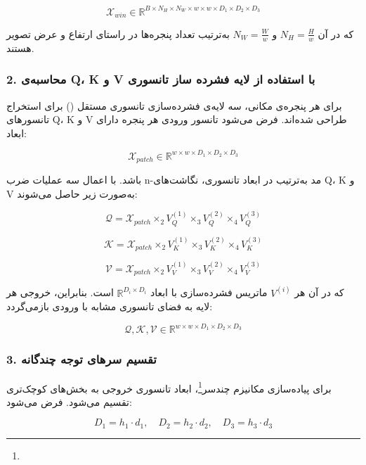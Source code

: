 \[
\mathcal{X}_{win} \in \mathbb{R}^{B \times N_H \times N_W \times w \times w \times D_1 \times D_2 \times D_3}
\]

که در آن $N_H = \frac{H}{w}$ و $N_W = \frac{W}{w}$ به‌ترتیب تعداد پنجره‌ها در راستای ارتفاع و عرض تصویر هستند.

\subsubsection*{2. محاسبه‌ی Q، K و V با استفاده از لایه فشرده ساز تانسوری}

برای هر پنجره‌ی مکانی، سه لایه‌ی فشرده‌سازی تانسوری مستقل () برای استخراج تانسورهای Q، K و V طراحی شده‌اند. فرض می‌شود تانسور ورودی هر پنجره دارای ابعاد:

\[
\mathcal{X}_{patch} \in \mathbb{R}^{w \times w \times D_1 \times D_2 \times D_3}
\]

باشد. با اعمال سه عملیات ضرب n-مد به‌ترتیب در ابعاد تانسوری، نگاشت‌های Q، K و V به‌صورت زیر حاصل می‌شوند:

\begin{equation}
	\mathcal{Q} = \mathcal{X}_{patch} \times_2 V_Q^{(1)} \times_3 V_Q^{(2)} \times_4 V_Q^{(3)}
\end{equation}

\begin{equation}
	\mathcal{K} = \mathcal{X}_{patch} \times_2 V_K^{(1)} \times_3 V_K^{(2)} \times_4 V_K^{(3)}
\end{equation}

\begin{equation}
	\mathcal{V} = \mathcal{X}_{patch} \times_2 V_V^{(1)} \times_3 V_V^{(2)} \times_4 V_V^{(3)}
\end{equation}


که در آن هر $V^{(i)}$ ماتریس فشرده‌سازی با ابعاد $\mathbb{R}^{D_i \times D_i}$ است. بنابراین، خروجی هر لایه به فضای تانسوری مشابه با ورودی بازمی‌گردد:

\[
\mathcal{Q}, \mathcal{K}, \mathcal{V} \in \mathbb{R}^{w \times w \times D_1 \times D_2 \times D_3}
\]

\subsubsection*{3. تقسیم سرهای توجه چندگانه}

برای پیاده‌سازی مکانیزم چندسر\footnote{}، ابعاد تانسوری خروجی به بخش‌های کوچک‌تری تقسیم می‌شود. فرض می‌شود:

\[
D_1 = h_1 \cdot d_1, \quad D_2 = h_2 \cdot d_2, \quad D_3 = h_3 \cdot d_3
\]

